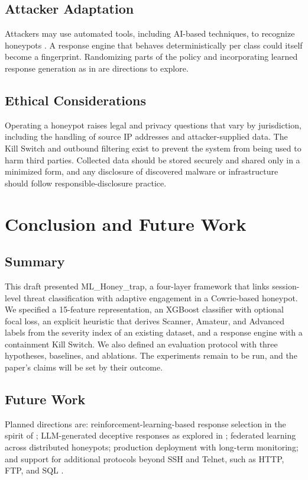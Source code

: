 \documentclass[conference]{IEEEtran}
\newcommand{\sys}{ML\_Honey\_trap}
\begin{document}
\subsection{Attacker Adaptation}
Attackers may use automated tools, including AI-based techniques, to recognize honeypots \cite{ref8}. A response engine that behaves deterministically per class could itself become a fingerprint. Randomizing parts of the policy and incorporating learned response generation as in \cite{ref8} are directions to explore.

\subsection{Ethical Considerations}
Operating a honeypot raises legal and privacy questions that vary by jurisdiction, including the handling of source IP addresses and attacker-supplied data. The Kill Switch and outbound filtering exist to prevent the system from being used to harm third parties. Collected data should be stored securely and shared only in a minimized form, and any disclosure of discovered malware or infrastructure should follow responsible-disclosure practice.

\section{Conclusion and Future Work}\label{sec:concl}
\subsection{Summary}
This draft presented \sys, a four-layer framework that links session-level threat classification with adaptive engagement in a Cowrie-based honeypot. We specified a 15-feature representation, an XGBoost classifier with optional focal loss, an explicit heuristic that derives Scanner, Amateur, and Advanced labels from the severity index of an existing dataset, and a response engine with a containment Kill Switch. We also defined an evaluation protocol with three hypotheses, baselines, and ablations. The experiments remain to be run, and the paper's claims will be set by their outcome.

\subsection{Future Work}
Planned directions are: reinforcement-learning-based response selection in the spirit of \cite{ref7}; LLM-generated deceptive responses as explored in \cite{ref9}; federated learning across distributed honeypots; production deployment with long-term monitoring; and support for additional protocols beyond SSH and Telnet, such as HTTP, FTP, and SQL \cite{ref6}.
\end{document}
